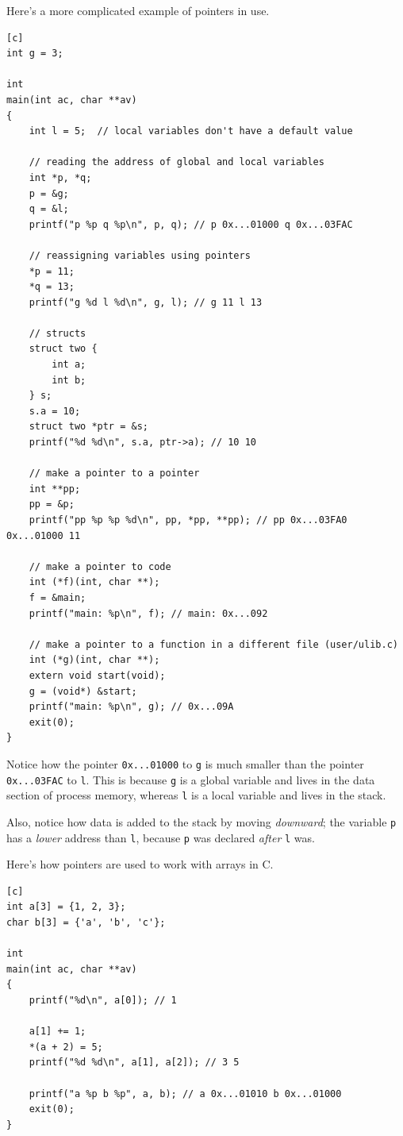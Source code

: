 Here's a more complicated example of pointers in use.

\begin{verbatim}[c]
int g = 3;

int
main(int ac, char **av)
{
    int l = 5;  // local variables don't have a default value

    // reading the address of global and local variables
    int *p, *q;
    p = &g;
    q = &l;
    printf("p %p q %p\n", p, q); // p 0x...01000 q 0x...03FAC

    // reassigning variables using pointers
    *p = 11;
    *q = 13;
    printf("g %d l %d\n", g, l); // g 11 l 13

    // structs
    struct two {
        int a;
        int b;
    } s;
    s.a = 10;
    struct two *ptr = &s;
    printf("%d %d\n", s.a, ptr->a); // 10 10

    // make a pointer to a pointer
    int **pp;
    pp = &p;
    printf("pp %p %p %d\n", pp, *pp, **pp); // pp 0x...03FA0 0x...01000 11

    // make a pointer to code
    int (*f)(int, char **);
    f = &main;
    printf("main: %p\n", f); // main: 0x...092

    // make a pointer to a function in a different file (user/ulib.c)
    int (*g)(int, char **);
    extern void start(void);
    g = (void*) &start;
    printf("main: %p\n", g); // 0x...09A
    exit(0);
}
\end{verbatim}

Notice how the pointer \verb|0x...01000| to \verb|g|
is much smaller than the pointer \verb|0x...03FAC| to \verb|l|.
This is because \verb|g| is a global variable
and lives in the data section of process memory,
whereas \verb|l| is a local variable and lives in the stack.

Also, notice how data is added to the stack by moving \emph{downward};
the variable \verb|p| has a \emph{lower} address than \verb|l|,
because \verb|p| was declared \emph{after} \verb|l| was.

Here's how pointers are used to work with arrays in C.

\begin{verbatim}[c]
int a[3] = {1, 2, 3};
char b[3] = {'a', 'b', 'c'};

int
main(int ac, char **av)
{
    printf("%d\n", a[0]); // 1
    
    a[1] += 1;
    *(a + 2) = 5;
    printf("%d %d\n", a[1], a[2]); // 3 5

    printf("a %p b %p", a, b); // a 0x...01010 b 0x...01000
    exit(0);
}
\end{verbatim}

